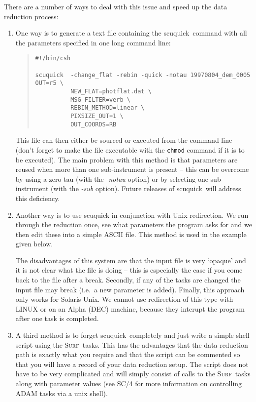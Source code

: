 \documentclass[twoside,11pt]{article}
\newenvironment{myquote}{\begin{quote}\begin{small}}{\end{small}\end{quote}}
\newcommand{\surf}{\xref{\textsc{Surf}}{sun216}{}}
\newcommand{\task}[1]{\textsf{#1}}
\newcommand{\scuquick}{\xref{\task{scuquick}}{sun216}{SCUQUICK}}
\newcommand{\xref}[3]{#1}
\begin{document}
There are a number of ways to deal with this issue and speed up the data
reduction process:
\begin{enumerate}
\item One way is to generate a text file containing the \scuquick\ command
with all the parameters specified in one long command line:

\begin{myquote}
\begin{verbatim}
#!/bin/csh

scuquick  -change_flat -rebin -quick -notau 19970804_dem_0005 OUT=r5 \
          NEW_FLAT=photflat.dat \
          MSG_FILTER=verb \
          REBIN_METHOD=linear \
          PIXSIZE_OUT=1 \
          OUT_COORDS=RB 
\end{verbatim}
\end{myquote}
This file can then either be sourced or executed from the command line (don't
forget to make the file executable with the \texttt{chmod} command if it is to 
be executed). The main
problem with this method is that parameters are reused when more than one
sub-instrument is present -- this can be overcome by using a zero tau 
(with the \textit{-notau} option) or by selecting one sub-instrument (with the
\textit{-sub} option). Future releases of \scuquick\ will address this
deficiency. 

\item Another way is to use scuquick in conjunction with Unix redirection.
We run through the reduction once, see
what parameters the program asks for and we then edit these into a simple
ASCII file. This method is used in the example given below.

The disadvantages of this system are that the input file is very `opaque' and
it is not clear what the file is doing -- this is especially the case if you
come back to the file after a break. Secondly, if any of the tasks are changed
the input file may break (i.e.\ a new parameter is added).  Finally, this
approach only works for Solaris Unix. We cannot use redirection of this type
with LINUX or on an Alpha (DEC) machine, because they interupt the program
after one task is completed.

\item A third method is to forget \scuquick\ completely and just write
a simple shell script using the \surf\ tasks. This has the advantages that the
data reduction path is exactly what you require and that the script can be
commented so that you will have a record of your data reduction setup. The
script does not have to be very complicated and will simply consist of calls
to the \surf\ tasks along with parameter values (see \xref{SC/4}{sc4}{}
\cite{sc4} for more information on controlling ADAM tasks via a unix shell).


\end{enumerate}
\end{document}

